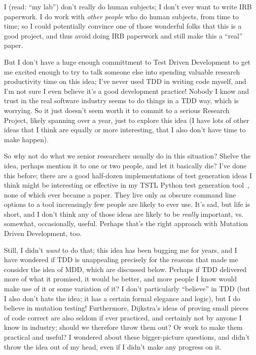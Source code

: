 \documentclass[sigplan,screen]{acmart}
\begin{document}
I (read: ``my lab'') don't really do human subjects; I don't ever want to
write IRB paperwork.  I do work with \emph{other people} who do human subjects,
from time to time; so I could potentially convince one of those
wonderful folks that this is a good project, and thus avoid doing IRB
paperwork and still make this a ``real'' paper.

But I don't have a huge enough committment to Test
Driven Development to get me excited enough to try to talk someone
else into spending valuable research productivity time on this idea; I've never used
TDD in writing code myself, and I'm not sure I even believe it's a good development
practice!  Nobody I know and trust in the real software industry seems
to do things in a TDD way, which is worrying.  So it just doesn't
seem worth it to commit to a serious Research Project, likely spanning
over a year, just to explore this idea (I have lots of other ideas
that I think are equally or more interesting, that I also don't have
time to make happen).

So why not do what we senior researchers usually do in this situation?
Shelve the idea, perhaps mention it to one or two people, and let it
basically die?  I've done this before; there are a good half-dozen
implementations of test generation ideas I think might be interesting
or effective in my TSTL Python test generation tool~\cite{tstlsttt}, none of which
ever became a paper.  They live only as obscure command line options
to a tool increasingly few people are likely to ever use.  It's sad,
but life is short, and I don't think any of those ideas are likely to
be \emph{really} important, vs. somewhat, occasionally, useful.
Perhaps that's the right approach with Mutation Driven Development,
too.

Still, I didn't \emph{want} to do that; this idea has been bugging me
for years, and I have wondered if TDD is unappealing precisely for the
reasons that made me consider the idea of MDD, which are discussed
below.  Perhaps if TDD delivered more of what it promised, it would be
better, and more people I know would make use of it or some variation
of it?  I don't particularly ``believe'' in TDD (but I also don't hate
the idea; it has a certain formal elegance and logic), but I do
believe in mutation testing!  Furthermore, Dijkstra's ideas of proving small pieces of code correct are
also seldom if ever practiced, and certainly not by anyone I know in industry; should we
therefore throw them out?  Or work to make them practical and useful?
I wondered about these bigger-picture questions, and didn't throw the idea out of my head, even if I didn't
make any progress on it.
\end{document}
